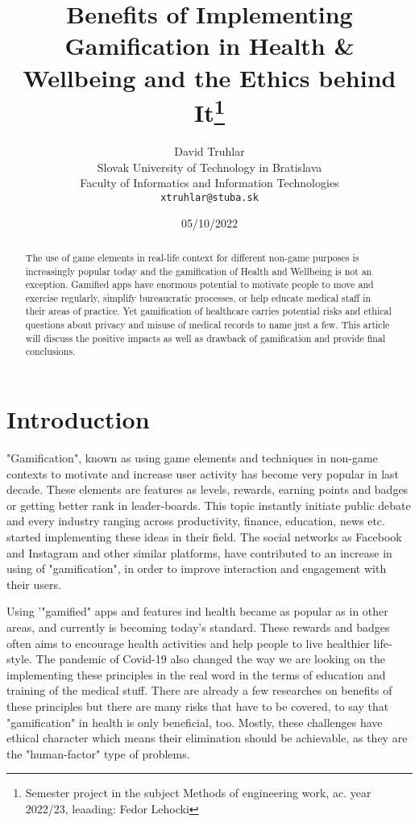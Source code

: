 \documentclass[10pt,twoside,english,a4paper]{article}
\title{Benefits of Implementing Gamification in Health \& Wellbeing and the Ethics behind It\thanks{Semester project in the subject Methods of engineering work, ac. year 2022/23, leaading: Fedor Lehocki}} %
\author{David Truhlar\\[2pt]
	{\small Slovak University of Technology in Bratislava}\\
	{\small Faculty of Informatics and Information Technologies}\\
	{\small \texttt{xtruhlar@stuba.sk}}
	}
\date{\small 05/10/2022} %
\begin{document}
\maketitle

\begin{abstract}
The use of game elements in real-life context for different non-game purposes is increasingly popular today and the gamification of Health and Wellbeing is not an exception. Gamified apps have enormous potential to motivate people to move and exercise regularly, simplify bureaucratic processes, or help educate medical staff in their areas of practice. Yet gamification of healthcare carries potential risks and ethical questions about privacy and misuse of medical records to name just a few. This article will discuss the positive impacts as well as drawback of gamification and provide final conclusions.
\end{abstract}

%
%
%

\section{Introduction}
"Gamification", known as using game elements and techniques  in non-game contexts to motivate and increase user activity \cite{Gamefulness} has become very popular in last decade. These elements are features as levels, rewards, earning points and badges or getting better rank in leader-boards. This topic instantly initiate public debate and every industry ranging across productivity, finance, education, news etc. \cite{Gamefulness} started implementing these ideas in their field. The social networks as Facebook and Instagram and other similar platforms, have contributed to an increase in using of "gamification", in order to improve interaction and engagement with their users. 

Using '"gamified" apps and features ind health became as popular as in other areas, and currently is becoming today's standard. These rewards and badges often aims to encourage health activities and help people to live healthier life-style. The pandemic of Covid-19 also changed the way we are looking on the implementing these principles in the real word in the terms of education and training of the medical stuff.  There are already a few researches on benefits of these principles but there are many risks that have to be covered, to say that "gamification" in health is only beneficial, too. Mostly, these challenges have ethical character which means their elimination should be achievable,  as they are the "human-factor" type of problems.
\end{document}
